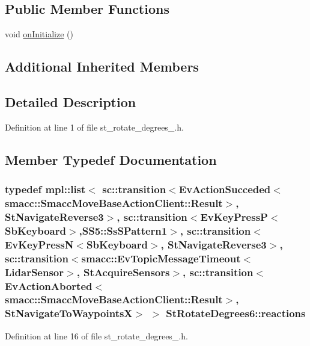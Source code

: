 \subsection*{Public Member Functions}
\begin{DoxyCompactItemize}
\item 
void \hyperlink{structStRotateDegrees6_ad83461ae95f2862d684609df5713d980}{on\+Initialize} ()
\end{DoxyCompactItemize}
\subsection*{Additional Inherited Members}


\subsection{Detailed Description}


Definition at line 1 of file st\+\_\+rotate\+\_\+degrees\+\_.\+h.



\subsection{Member Typedef Documentation}
\subsubsection[{\texorpdfstring{reactions}{reactions}}]{\setlength{\rightskip}{0pt plus 5cm}typedef mpl\+::list$<$ sc\+::transition$<$Ev\+Action\+Succeded$<$smacc\+::\+Smacc\+Move\+Base\+Action\+Client\+::\+Result$>$, {\bf St\+Navigate\+Reverse3}$>$, sc\+::transition$<$Ev\+Key\+PressP$<$Sb\+Keyboard$>$,{\bf S\+S5\+::\+Ss\+S\+Pattern1}$>$, sc\+::transition$<$Ev\+Key\+PressN$<$Sb\+Keyboard$>$, {\bf St\+Navigate\+Reverse3}$>$, sc\+::transition$<${\bf smacc\+::\+Ev\+Topic\+Message\+Timeout}$<${\bf Lidar\+Sensor}$>$, {\bf St\+Acquire\+Sensors}$>$, sc\+::transition$<$Ev\+Action\+Aborted$<$smacc\+::\+Smacc\+Move\+Base\+Action\+Client\+::\+Result$>$, {\bf St\+Navigate\+To\+WaypointsX}$>$ $>$ {\bf St\+Rotate\+Degrees6\+::reactions}}\hypertarget{structStRotateDegrees6_aa9923171ad502aeb03612b182d8d73ea}{}\label{structStRotateDegrees6_aa9923171ad502aeb03612b182d8d73ea}


Definition at line 16 of file st\+\_\+rotate\+\_\+degrees\+\_.\+h.



